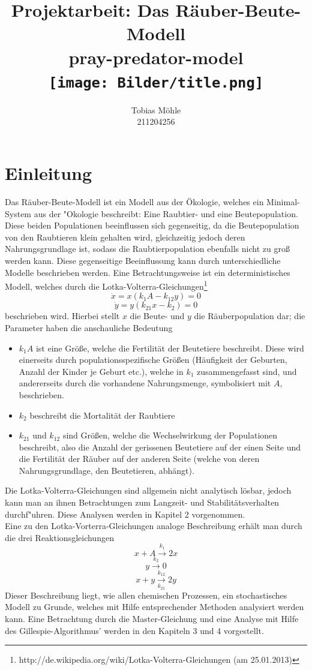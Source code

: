 \documentclass[11pt]{article}
\begin{document}
\begin{titlepage}
\title{\textbf{\Huge{Projektarbeit: Das Räuber-Beute-Modell}} \\ \large{pray-predator-model}\\ \texttt{[image: Bilder/title.png]}}
\author{Tobias Möhle \\ 211204256}
\maketitle
\end{titlepage}
\tableofcontents

\section{Einleitung}
Das Räuber-Beute-Modell ist ein Modell aus der Ökologie, welches ein Minimal-System aus der "Okologie beschreibt: Eine Raubtier- und eine Beutepopulation. Diese beiden Populationen beeinflussen sich gegenseitig, da die Beutepopulation von den Raubtieren klein gehalten wird, gleichzeitig jedoch deren Nahrungsgrundlage ist, sodass die Raubtierpopulation ebenfalls nicht zu groß werden kann. Diese gegenseitige Beeinflussung kann durch unterschiedliche Modelle beschrieben werden.
Eine Betrachtungsweise ist ein deterministisches Modell, welches durch die Lotka-Volterra-Gleichungen\footnote{http://de.wikipedia.org/wiki/Lotka-Volterra-Gleichungen (am 25.01.2013)}
$$\dot x=x(k_1 A-k_{12}y)=0$$
$$\dot y=y(k_{21}x-k_2)=0$$
beschrieben wird.
Hierbei stellt $x$ die Beute- und $y$ die Räuberpopulation dar; die Parameter haben die anschauliche Bedeutung
\begin{itemize}
   \item $k_1 A$ ist eine Größe, welche die Fertilität der Beutetiere beschreibt. Diese wird einerseits durch populationsspezifische Größen (Häufigkeit der Geburten, Anzahl der Kinder je Geburt etc.), welche in $k_1$ zusammengefasst sind, und andererseits durch die vorhandene Nahrungsmenge, symbolisiert mit $A$, beschrieben.
   \item $k_2$ beschreibt die Mortalität der Raubtiere
   \item $k_{21}$ und $k_{12}$ sind Größen, welche die Wechselwirkung der Populationen beschreibt, also die Anzahl der gerissenen Beutetiere auf der einen Seite und die Fertilität der Räuber auf der anderen Seite (welche von deren Nahrungsgrundlage, den Beutetieren, abhängt).
\end{itemize}

Die Lotka-Volterra-Gleichungen sind allgemein nicht analytisch lösbar, jedoch kann man an ihnen Betrachtungen zum Langzeit- und Stabilitätsverhalten durchf"uhren. Diese Analysen werden in Kapitel 2 vorgenommen.\\
Eine zu den Lotka-Vorterra-Gleichungen analoge Beschreibung erhält man durch die drei Reaktionsgleichungen
$$x+A \xrightarrow{k_1} 2x $$
$$y  \xrightarrow{k_2}0$$
$$x+y \xrightarrow[k_{21}]{k_{12}} 2y $$
Dieser Beschreibung liegt, wie allen chemischen Prozessen, ein stochastisches Modell zu Grunde, welches mit Hilfe entsprechender Methoden analysiert werden kann. Eine Betrachtung durch die Master-Gleichung und eine Analyse mit Hilfe des Gillespie-Algorithmus' werden in den Kapiteln 3 und 4 vorgestellt.
\end{document}
